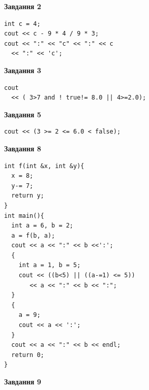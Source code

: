 \documentclass[12pt, ukrainian]{article}
\begin{document}
{\begin {large}
\begin{minipage}[t]{7.0cm}
\end{minipage}
\vline \hspace{1mm}
\begin{minipage}[t]{11.0cm}

\begin{center}
\textbf{Завдання 2}
\end{center}
\vspace{-8mm}

\begin{verbatim}
int c = 4;
cout << c - 9 * 4 / 9 * 3;
cout << ":" << "c" << ":" << c 
  << ":" << 'c';
\end{verbatim}



\begin{center}
\textbf{Завдання 3}
\end{center}
\vspace{-8mm}

\begin{verbatim}
cout 
  << ( 3>7 and ! true!= 8.0 || 4>=2.0);
\end{verbatim}



\begin{center}
\textbf{Завдання 5}
\end{center}
\vspace{-8mm}

\begin{verbatim}
cout << (3 >= 2 <= 6.0 < false);
\end{verbatim}



\begin{center}
\textbf{Завдання 8}
\end{center}
\vspace{-8mm}

\begin{verbatim}
int f(int &x, int &y){
  x = 8;
  y-= 7;
  return y;
}
int main(){
  int a = 6, b = 2;
  a = f(b, a);
  cout << a << ":" << b <<':';
  {
    int a = 1, b = 5;
    cout << ((b<5) || ((a-=1) <= 5))
       << a << ":" << b << ":";
  }
  {
    a = 9;
    cout << a << ':';
  }
  cout << a << ":" << b << endl;
  return 0;
}
\end{verbatim}

\end{minipage}


\begin{minipage}[t]{7.0cm}

\begin{center}
\textbf{Завдання 9}
\end{center}
\vspace{-8mm}


\end{minipage}
\end{large}}
\end{document}
